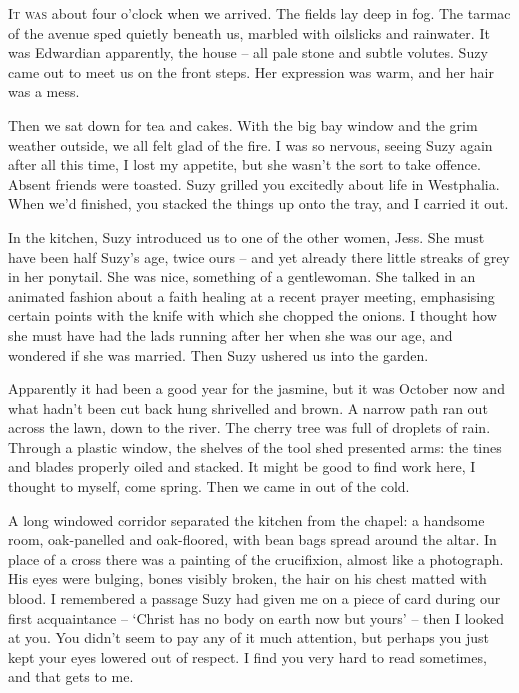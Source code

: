 \noindent \textsc{It was} about four o'clock when we arrived. The fields lay deep in fog. The tarmac of the avenue sped quietly beneath us, marbled with oilslicks and rainwater. It was Edwardian apparently, the house -- all pale stone and subtle volutes. Suzy came out to meet us on the front steps. Her expression was warm, and her hair was a mess.

Then we sat down for tea and cakes. With the big bay window and the grim weather outside, we all felt glad of the fire. I was so nervous, seeing Suzy again after all this time, I lost my appetite, but she wasn't the sort to take offence. Absent friends were toasted. Suzy grilled you excitedly about life in Westphalia. When we'd finished, you stacked the things up onto the tray, and I carried it out.

In the kitchen, Suzy introduced us to one of the other women, Jess. She must have been half Suzy's age, twice ours -- and yet already there little streaks of grey in her ponytail. She was nice, something of a gentlewoman. She talked in an animated fashion about a faith healing at a recent prayer meeting, emphasising certain points with the knife with which she chopped the onions. I thought how she must have had the lads running after her when she was our age, and wondered if she was married. Then Suzy ushered us into the garden.

Apparently it had been a good year for the jasmine, but it was October now and what hadn't been cut back hung shrivelled and brown. A narrow path ran out across the lawn, down to the river. The cherry tree was full of droplets of rain. Through a plastic window, the shelves of the tool shed presented arms: the tines and blades properly oiled and stacked. It might be good to find work here, I thought to myself, come spring. Then we came in out of the cold.

A long windowed corridor separated the kitchen from the chapel: a handsome room, oak-panelled and oak-floored, with bean bags spread around the altar. In place of a cross there was a painting of the crucifixion, almost like a photograph. His eyes were bulging, bones visibly broken, the hair on his chest matted with blood. I remembered a passage Suzy had given me on a piece of card during our first acquaintance -- `Christ has no body on earth now but yours' -- then I looked at you. You didn't seem to pay any of it much attention, but perhaps you just kept your eyes lowered out of respect. I find you very hard to read sometimes, and that gets to me.


